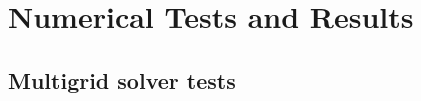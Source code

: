 
\chapter{Numerical Tests and Results}  %

\ifpdf
    \graphicspath{{Chapter4/Figs/PDF/}{Chapter4/Figs/}}
\else
    \graphicspath{{Chapter4/Figs/}}
\fi


\section{Multigrid solver tests} %
\label{section4.1}
